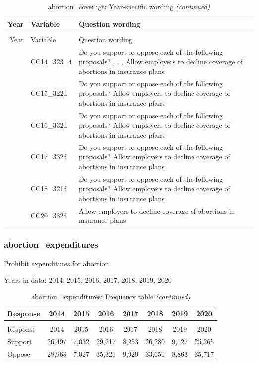 \documentclass[
  12pt]{article}
\begin{document}
\begin{longtable}[t]{rl>{\raggedright\arraybackslash}p{10cm}}
\caption{\label{tab:unnamed-chunk-5}abortion\_coverage: Year-specific wording}\\
\toprule
Year & Variable & Question wording\\
\midrule
\endfirsthead
\caption[]{abortion\_coverage: Year-specific wording \textit{(continued)}}\\
\toprule
Year & Variable & Question wording\\
\midrule
\endhead

\endfoot
\bottomrule
\endlastfoot
2014 & CC14\_323\_4 & Do you support or oppose each of the following proposals? . . . Allow employers to decline coverage of abortions in insurance plans\\
\addlinespace
2015 & CC15\_322d & Do you support or oppose each of the following proposals? Allow employers to decline coverage of abortions in insurance plans\\
\addlinespace
2016 & CC16\_332d & Do you support or oppose each of the following proposals? Allow employers to decline coverage of abortions in insurance plans\\
\addlinespace
2017 & CC17\_332d & Do you support or oppose each of the following proposals? Allow employers to decline coverage of abortions in insurance plans\\
\addlinespace
2018 & CC18\_321d & Do you support or oppose each of the following proposals? Allow employers to decline coverage of abortions in insurance plans\\
\addlinespace
2020 & CC20\_332d & Allow employers to decline coverage of abortions in insurance plans\\*
\end{longtable}
\endgroup{}

\hypertarget{abortion_expenditures}{%
\subsubsection{abortion\_expenditures}\label{abortion_expenditures}}

Prohibit expenditures for abortion

Years in data: 2014, 2015, 2016, 2017, 2018, 2019,
2020\begingroup\fontsize{10}{12}\selectfont

\begin{longtable}[t]{lccccccc}
\caption{\label{tab:unnamed-chunk-5}abortion\_expenditures: Frequency table}\\
\toprule
Response & 2014 & 2015 & 2016 & 2017 & 2018 & 2019 & 2020\\
\midrule
\endfirsthead
\caption[]{abortion\_expenditures: Frequency table \textit{(continued)}}\\
\toprule
Response & 2014 & 2015 & 2016 & 2017 & 2018 & 2019 & 2020\\
\midrule
\endhead

\endfoot
\bottomrule
\endlastfoot
Support & 26,497 & 7,032 & 29,217 & 8,253 & 26,280 & 9,127 & 25,265\\
Oppose & 28,968 & 7,027 & 35,321 & 9,929 & 33,651 & 8,863 & 35,717\\*
\end{longtable}
\endgroup{}
\end{document}

